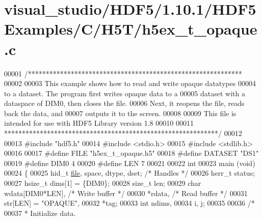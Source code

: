 \hypertarget{visual__studio_2_h_d_f5_21_810_81_2_h_d_f5_examples_2_c_2_h5_t_2h5ex__t__opaque_8c_source}{}\section{visual\+\_\+studio/\+H\+D\+F5/1.10.1/\+H\+D\+F5\+Examples/\+C/\+H5\+T/h5ex\+\_\+t\+\_\+opaque.c}
\label{visual__studio_2_h_d_f5_21_810_81_2_h_d_f5_examples_2_c_2_h5_t_2h5ex__t__opaque_8c_source}

\begin{DoxyCode}
00001 \textcolor{comment}{/************************************************************}
00002 \textcolor{comment}{}
00003 \textcolor{comment}{  This example shows how to read and write opaque datatypes}
00004 \textcolor{comment}{  to a dataset.  The program first writes opaque data to a}
00005 \textcolor{comment}{  dataset with a dataspace of DIM0, then closes the file.}
00006 \textcolor{comment}{  Next, it reopens the file, reads back the data, and}
00007 \textcolor{comment}{  outputs it to the screen.}
00008 \textcolor{comment}{}
00009 \textcolor{comment}{  This file is intended for use with HDF5 Library version 1.8}
00010 \textcolor{comment}{}
00011 \textcolor{comment}{ ************************************************************/}
00012 
00013 \textcolor{preprocessor}{#include "hdf5.h"}
00014 \textcolor{preprocessor}{#include <stdio.h>}
00015 \textcolor{preprocessor}{#include <stdlib.h>}
00016 
00017 \textcolor{preprocessor}{#define FILE            "h5ex\_t\_opaque.h5"}
00018 \textcolor{preprocessor}{#define DATASET         "DS1"}
00019 \textcolor{preprocessor}{#define DIM0            4}
00020 \textcolor{preprocessor}{#define LEN             7}
00021 
00022 \textcolor{keywordtype}{int}
00023 main (\textcolor{keywordtype}{void})
00024 \{
00025     hid\_t       \hyperlink{structfile}{file}, space, dtype, dset;   \textcolor{comment}{/* Handles */}
00026     herr\_t      status;
00027     hsize\_t     dims[1] = \{DIM0\};
00028     \textcolor{keywordtype}{size\_t}      len;
00029     \textcolor{keywordtype}{char}        wdata[DIM0*LEN],            \textcolor{comment}{/* Write buffer */}
00030                 *rdata,                     \textcolor{comment}{/* Read buffer */}
00031                 str[LEN] = \textcolor{stringliteral}{"OPAQUE"},
00032                 *tag;
00033     \textcolor{keywordtype}{int}         ndims,
00034                 i, j;
00035 
00036     \textcolor{comment}{/*}
00037 \textcolor{comment}{     * Initialize data.}

\end{DoxyCode}
